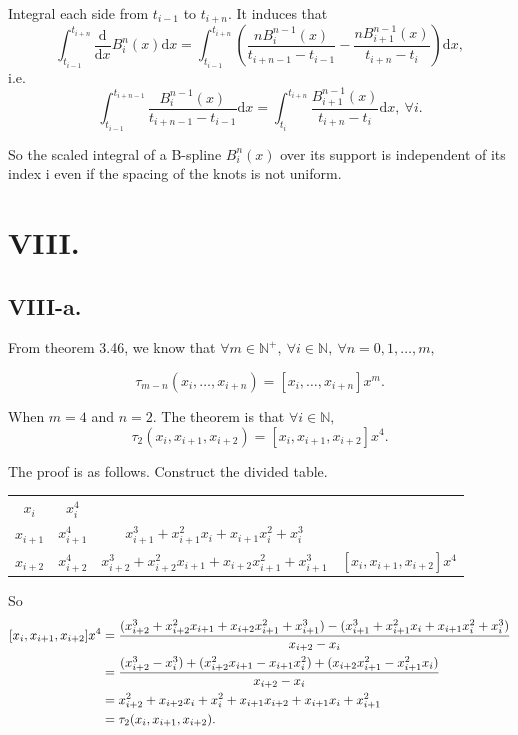 \documentclass[a4paper]{article}
\begin{document}
Integral each side from $t_{i-1}$ to $t_{i+n}$. It induces that 
$$
\int_{t_{i-1}}^{t_{i+n}}\frac{\mathrm{d}}{\mathrm{d}x}B_i^n(x)\mathrm{d}x=\int_{t_{i-1}}^{t_{i+n}}(\frac{nB_{i}^{n-1}(x)}{t_{i+n-1}-t_{i-1}}-\frac{nB_{i+1}^{n-1}(x)}{t_{i+n}-t_{i}})\mathrm{d}x,
$$
i.e. 
$$
\int_{t_{i-1}}^{t_{i+n-1}}\frac{B_{i}^{n-1}(x)}{t_{i+n-1}-t_{i-1}}\mathrm{d}x=\int_{t_{i}}^{t_{i+n}}\frac{B_{i+1}^{n-1}(x)}{t_{i+n}-t_{i}}\mathrm{d}x, \ \forall i.
$$

So the scaled integral of a B-spline $B^n_{i} (x)$ over its support is independent of its index i even if the spacing of the knots is not uniform.

\section*{VIII.}
\subsection*{VIII-a.}
From theorem 3.46, we know that $\forall m\in\mathbb{N}^{+},\:\forall i\in\mathbb{N},\:\forall n=0,1,\ldots,m,$

\begin{equation}\label{eq:8.1}
  \tau_{m-n}(x_{i},\ldots,x_{i+n})=[x_{i},\ldots,x_{i+n}]x^{m}.
\end{equation}


When $m=4$ and $n=2$. The theorem is that $\forall i\in\mathbb{N},$
$$
\tau_{2}(x_{i},x_{i+1},x_{i+2})=[x_{i},x_{i+1},x_{i+2}]x^{4}.
$$

The proof is as follows. Construct the divided table.

\begin{table}[H]
  \centering
  \begin{tabular}{c|ccc}
    $x_{i}$ & $x_{i}^4$ & &  \\
    $x_{i+1}$ & $x_{i+1}^4$ & $x_{i+1}^3+x_{i+1}^{2}x_{i}+x_{i+1}x_{i}^{2}+x_{i}^3$ &   \\
    $x_{i+2}$ & $x_{i+2}^4$ & $x_{i+2}^3+x_{i+2}^{2}x_{i+1}+x_{i+2}x_{i+1}^{2}+x_{i+1}^3$ & $[x_{i},x_{i+1},x_{i+2}]x^{4}$  \\
  \end{tabular}
\end{table}

So
$$
\begin{aligned}
  \relax [x_{i},x_{i+1},x_{i+2}]x^{4}&=\dfrac{(x_{i+2}^3+x_{i+2}^{2}x_{i+1}+x_{i+2}x_{i+1}^{2}+x_{i+1}^3)-(x_{i+1}^3+x_{i+1}^{2}x_{i}+x_{i+1}x_{i}^{2}+x_{i}^3)}{x_{i+2}-x_{i}}\\
  &=\dfrac{(x_{i+2}^3-x_{i}^3)+(x_{i+2}^{2}x_{i+1}-x_{i+1}x_{i}^{2})+(x_{i+2}x_{i+1}^{2}-x_{i+1}^{2}x_{i})}{x_{i+2}-x_{i}}\\
  &=x_{i+2}^2+x_{i+2}x_{i}+x_{i}^2+x_{i+1}x_{i+2}+x_{i+1}x_{i}+x_{i+1}^2\\
  &=\tau_{2}(x_{i},x_{i+1},x_{i+2}).
\end{aligned}
$$
\end{document}
